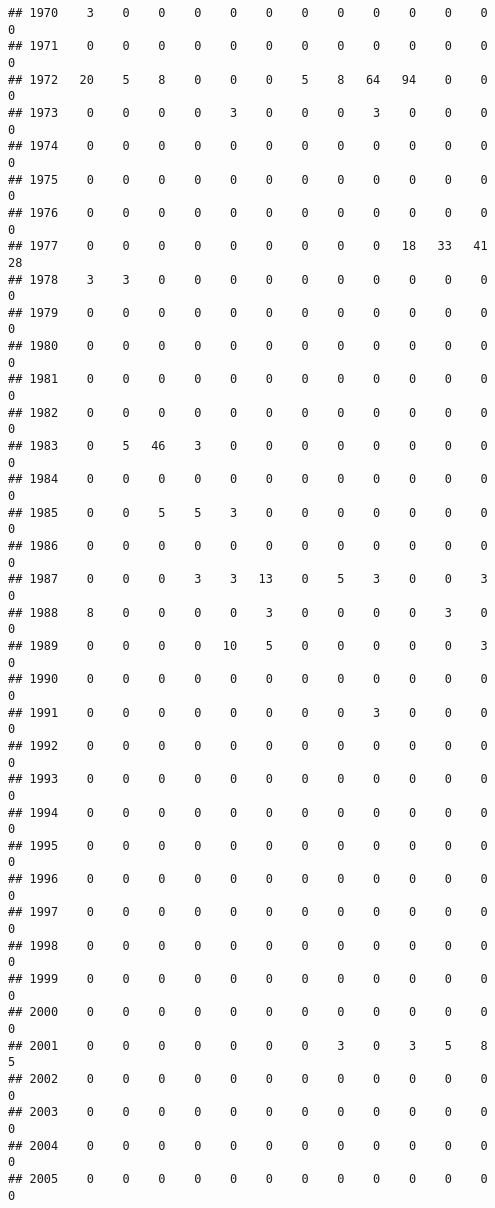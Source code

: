 \documentclass[]{article}
\begin{document}
\begin{verbatim}
## 1970    3    0    0    0    0    0    0    0    0    0    0    0    0
## 1971    0    0    0    0    0    0    0    0    0    0    0    0    0
## 1972   20    5    8    0    0    0    5    8   64   94    0    0    0
## 1973    0    0    0    0    3    0    0    0    3    0    0    0    0
## 1974    0    0    0    0    0    0    0    0    0    0    0    0    0
## 1975    0    0    0    0    0    0    0    0    0    0    0    0    0
## 1976    0    0    0    0    0    0    0    0    0    0    0    0    0
## 1977    0    0    0    0    0    0    0    0    0   18   33   41   28
## 1978    3    3    0    0    0    0    0    0    0    0    0    0    0
## 1979    0    0    0    0    0    0    0    0    0    0    0    0    0
## 1980    0    0    0    0    0    0    0    0    0    0    0    0    0
## 1981    0    0    0    0    0    0    0    0    0    0    0    0    0
## 1982    0    0    0    0    0    0    0    0    0    0    0    0    0
## 1983    0    5   46    3    0    0    0    0    0    0    0    0    0
## 1984    0    0    0    0    0    0    0    0    0    0    0    0    0
## 1985    0    0    5    5    3    0    0    0    0    0    0    0    0
## 1986    0    0    0    0    0    0    0    0    0    0    0    0    0
## 1987    0    0    0    3    3   13    0    5    3    0    0    3    0
## 1988    8    0    0    0    0    3    0    0    0    0    3    0    0
## 1989    0    0    0    0   10    5    0    0    0    0    0    3    0
## 1990    0    0    0    0    0    0    0    0    0    0    0    0    0
## 1991    0    0    0    0    0    0    0    0    3    0    0    0    0
## 1992    0    0    0    0    0    0    0    0    0    0    0    0    0
## 1993    0    0    0    0    0    0    0    0    0    0    0    0    0
## 1994    0    0    0    0    0    0    0    0    0    0    0    0    0
## 1995    0    0    0    0    0    0    0    0    0    0    0    0    0
## 1996    0    0    0    0    0    0    0    0    0    0    0    0    0
## 1997    0    0    0    0    0    0    0    0    0    0    0    0    0
## 1998    0    0    0    0    0    0    0    0    0    0    0    0    0
## 1999    0    0    0    0    0    0    0    0    0    0    0    0    0
## 2000    0    0    0    0    0    0    0    0    0    0    0    0    0
## 2001    0    0    0    0    0    0    0    3    0    3    5    8    5
## 2002    0    0    0    0    0    0    0    0    0    0    0    0    0
## 2003    0    0    0    0    0    0    0    0    0    0    0    0    0
## 2004    0    0    0    0    0    0    0    0    0    0    0    0    0
## 2005    0    0    0    0    0    0    0    0    0    0    0    0    0

\end{verbatim}
\end{document}
